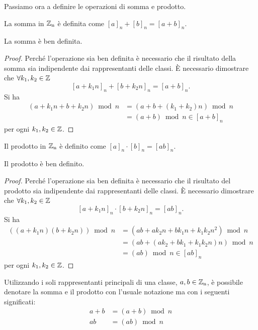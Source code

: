 Passiamo ora a definire le operazioni di somma e prodotto.

\begin{definizione}
La somma in $\operatorname*{\mathbb{Z}_n}$ è definita come $[a]_n+[b]_n=[a+b]_n$.
\end{definizione}

\begin{proposizione}
La somma è ben definita.
\end{proposizione}
\begin{proof}
Perché l'operazione sia ben definita è necessario che il risultato della somma sia indipendente dai rappresentanti delle classi. È necessario dimostrare che $\forall k_1,k_2\in\operatorname*{\mathbb{Z}}$
\[
[a+k_1n]_n+[b+k_2n]_n=[a+b]_n.
\]
Si ha
\begin{align*}
(a+k_1n+b+k_2n)\bmod n &= (a+b + (k_1+k_2)n)\bmod n \\ 
&= (a+b)\bmod n \in [a+b]_n
\end{align*}
per ogni $k_1,k_2\in\operatorname*{\mathbb{Z}}$.
\end{proof}

\begin{definizione}
Il prodotto in $\operatorname*{\mathbb{Z}_n}$ è definito come $[a]_n\cdot[b]_n=[ab]_n$.
\end{definizione}

\begin{proposizione}
Il prodotto è ben definito.
\end{proposizione}
\begin{proof}
Perché l'operazione sia ben definita è necessario che il risultato del prodotto sia indipendente dai rappresentanti delle classi. È necessario dimostrare che $\forall k_1,k_2\in\operatorname*{\mathbb{Z}}$
\[
[a+k_1n]_n\cdot[b+k_2n]_n=[ab]_n.
\]
Si ha
\begin{align*}
((a+k_1n)(b+k_2n))\bmod n &= (ab + ak_2n + bk_1n + k_1k_2n^2)\bmod n \\ 
&= (ab + (ak_2 + bk_1 +k_1k_2n)n)\bmod n \\
&= (ab)\bmod n \in [ab]_n
\end{align*}
per ogni $k_1,k_2\in\operatorname*{\mathbb{Z}}$.
\end{proof}

Utilizzando i soli rappresentanti principali di una classe, $a,b\in\operatorname*{\mathbb{Z}_n}$, è possibile denotare la somma e il prodotto con l'usuale notazione ma con i seguenti significati:
\begin{align*}
a+b&=(a+b)\bmod n \\
ab&=(ab)\bmod n
\end{align*}

